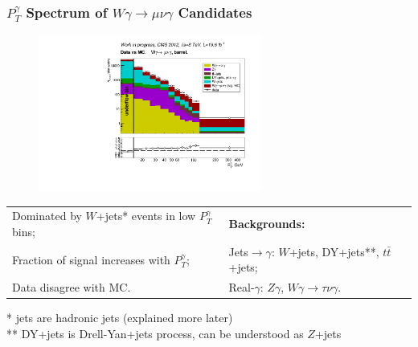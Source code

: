 \begin{frame}\frametitle{$P_T^{\gamma}$ Spectrum of $W\gamma\rightarrow\mu\nu\gamma$ Candidates}
  \begin{figure}[htb]
    \begin{center}
       \includegraphics[width=0.65\textwidth]{../figs/figs_v11/MUON_WGamma/PrepareYields/c_TotalDATAvsMC_Barrel__phoEt.pdf}  
    \end{center}
  \end{figure}

\tiny
  \begin{table}[h]
     \tiny
     \begin{center}
     \begin{tabular}{|l|l|}
     \hline
     Dominated by $W$+jets* events in low $P_T^{\gamma}$ bins; &  {\bfseries{ Backgrounds:}}\\ 
     Fraction of signal increases with $P_T^{\gamma}$; & Jets$\rightarrow\gamma$: $W$+jets, DY+jets**, $t\bar{t}$+jets;\\
     Data disagree with MC. & Real-$\gamma$: $Z\gamma$, $W\gamma\rightarrow\tau\nu\gamma$.\\
     \hline
      \end{tabular}
      \end{center}
  \end{table}

* jets are hadronic jets (explained more later)\\
** DY+jets is Drell-Yan+jets process, can be understood as $Z$+jets

\end{frame}


